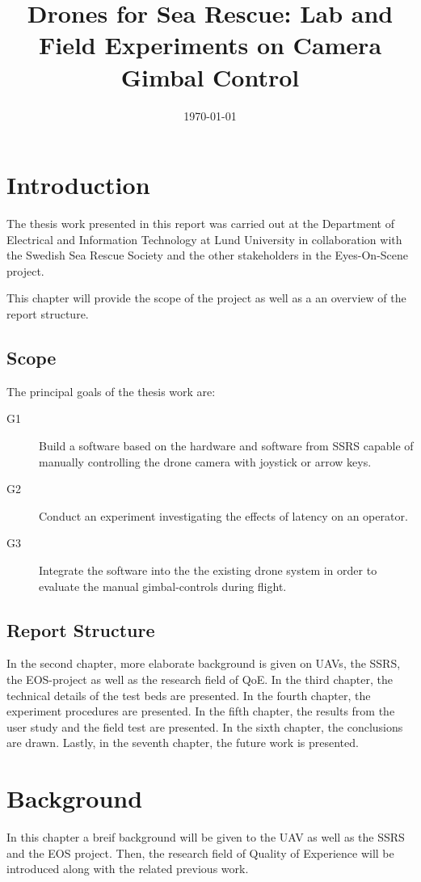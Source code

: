 \documentclass[nofilelist]{cslthse-msc}
\title{Drones for Sea Rescue: Lab and Field Experiments on Camera Gimbal Control}
\date{\today}
\begin{document}
\renewcommand{\bibname}{References}

\makefrontmatter
\chapter{Introduction}
The thesis work presented in this report was carried out at the Department of Electrical and Information Technology at Lund University in collaboration with the Swedish Sea Rescue Society and the other stakeholders in the Eyes-On-Scene project. 

This chapter will provide the scope of the project as well as a an overview of the report structure.

\section{Scope}
The principal goals of the thesis work are:
\begin{description}
   \item[G1] Build a software based on the hardware and software from SSRS capable of manually controlling the drone camera with joystick or arrow keys. 
   \item[G2] Conduct an experiment investigating the effects of latency on an operator. 
   \item[G3] Integrate the software into the the existing drone system in order to evaluate the manual gimbal-controls during flight.
\end{description}

\section{Report Structure}
In the second chapter, more elaborate background is given on UAVs, the SSRS, the EOS-project as well as the research field of QoE. In the third chapter, the technical details of the test beds are presented. In the fourth chapter, the experiment procedures are presented. In the fifth chapter, the results from the user study and the field test are presented. In the sixth chapter, the conclusions are drawn. Lastly, in the seventh chapter, the future work is presented.

\chapter{Background}
In this chapter a breif background will be given to the UAV as well as the SSRS and the EOS project. Then, the research field of Quality of Experience will be introduced along with the related previous work.
\end{document}
